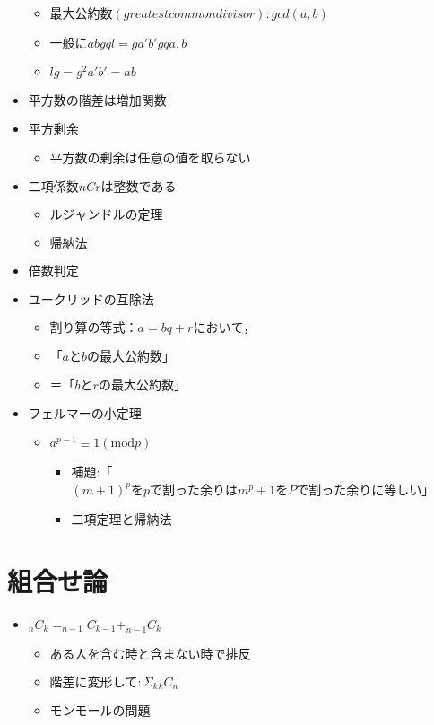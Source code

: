 \documentclass[dvipdfmx,uplatex]{jsarticle}
\begin{document}
\begin{itemize}
\begin{itemize}
		\item $ 最大公約数(greatest common divisor): gcd(a,b)$
		\item $ 一般に ab gq l = ga'b' gq a, b$
		\item $ lg = g^2a'b' = ab$
	\end{itemize}
	\item $ 平方数の階差は増加関数$
	\item $ 平方剰余$
	\begin{itemize}
		\item $ 平方数の剰余は任意の値を取らない$
	\end{itemize}
	\item $ 二項係数nCrは整数である$
	\begin{itemize}
		\item $ ルジャンドルの定理$
		\item $ 帰納法$
	\end{itemize}
	\item $ 倍数判定$
	\item $ ユークリッドの互除法$
	\begin{itemize}
		\item $ 割り算の等式：a=bq+r において，$
		\item $ 「a と b の最大公約数」$
		\item $ ＝「b と r の最大公約数」$
	\end{itemize}
	\item $ フェルマーの小定理$
	\begin{itemize}
		\item $ a^{p-1} \equiv 1 ( \mathrm{mod} p)$
		\begin{itemize}
			\item 補題:「$(m+1)^pをpで割った余りはm^p+1をPで割った余りに等しい$」
			\item 二項定理と帰納法
		\end{itemize}
	\end{itemize}
\end{itemize}

\section{組合せ論}
\begin{itemize}
	\item $ _nC_k = _{n-1}C_{k-1} + _{n-1}C_{k}$
	\begin{itemize}
		\item $ ある人を含む時と含まない時で排反$
		\item $ 階差に変形して: Σ_k {}_k C_n$
		\item $ モンモールの問題$
	\end{itemize}
\end{itemize}
\end{document}
